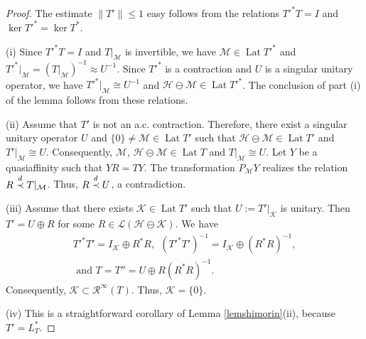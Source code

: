 \documentclass[a4paper,oneside,11pt]{amsart}
\numberwithin{equation}{section}
\theoremstyle{plain}
\theoremstyle{definition}
\begin{document}
\begin{proof} The estimate $\|T'\|\leq 1$ easy follows from the relations $T'^*T=I$ and $\ker T'^*=\ker T^*$. 

(i) Since $T'^*T=I$ and $T|_{\mathcal M}$ is invertible, we have 
$\mathcal M\in\operatorname{Lat}T'^*$ and  $T'^*|_{\mathcal M}=(T|_{\mathcal M})^{-1}\approx U^{-1}$. 
Since $T'^*$ is a contraction and $U$ is a singular unitary operator, we have 
$T'^*|_{\mathcal M}\cong U^{-1}$ and $\mathcal H\ominus\mathcal M\in\operatorname{Lat}T'^*$. 
The conclusion of part (i) of the lemma follows from these relations. 

 (ii) Assume that $T'$ is not an a.c. contraction.
 Therefore, there exist a singular unitary operator  $U$ and  $\{0\}\neq\mathcal M\in\operatorname{Lat}T'$ such that 
 $\mathcal H\ominus\mathcal M\in\operatorname{Lat}T'$ and  $T'|_{\mathcal M}\cong U$. 
Consequently, $\mathcal M$, $\mathcal H\ominus\mathcal M\in\operatorname{Lat}T$ and  $T|_{\mathcal M}\cong U$.
Let $Y$ be a quasiaffinity such that $YR=TY$.  
The transformation   
$P_{\mathcal M}Y$ realizes the relation $R\buildrel d \over\prec T|_{\mathcal M}$. Thus, $R\buildrel d \over\prec U$,
a contradiction.

(iii) Assume that  there exists 
$\mathcal K\in\operatorname{Lat}T'$ such that $U:=T'|_{\mathcal K}$ is unitary. Then $T'=U\oplus R$ for some  
 $R\in\mathcal L(\mathcal H\ominus\mathcal K)$. 
We have 
\begin{gather*} T'^*T'=I_{\mathcal K}\oplus R^*R, 
\ \ (T'^*T')^{-1}=I_{\mathcal K}\oplus (R^*R)^{-1},\\ \text{ and } 
T=T''=U\oplus R(R^*R)^{-1}. \end{gather*} 
 Consequently, $\mathcal K\subset\mathcal R^\infty(T)$. Thus, $\mathcal K=\{0\}$. 

(iv) This is a straightforward corollary of Lemma \ref{lemshimorin}(ii), because $T'=L_T^*$. 
\end{proof}
\end{document}
